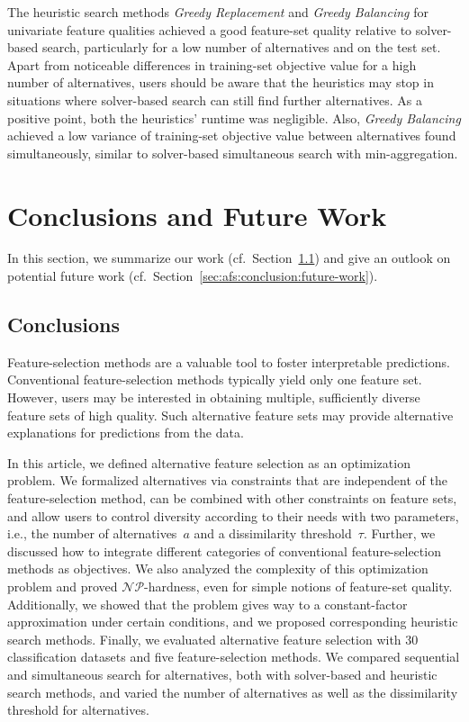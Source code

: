 \documentclass{article}
\theoremstyle{definition}
\begin{document}
The heuristic search methods \emph{Greedy Replacement} and \emph{Greedy Balancing} for univariate feature qualities achieved a good feature-set quality relative to solver-based search, particularly for a low number of alternatives and on the test set.
Apart from noticeable differences in training-set objective value for a high number of alternatives, users should be aware that the heuristics may stop in situations where solver-based search can still find further alternatives.
As a positive point, both the heuristics' runtime was negligible.
Also, \emph{Greedy Balancing} achieved a low variance of training-set objective value between alternatives found simultaneously, similar to solver-based simultaneous search with min-aggregation.

\section{Conclusions and Future Work}
\label{sec:afs:conclusion}

In this section, we summarize our work (cf.~Section~\ref{sec:afs:conclusion:conclusion}) and give an outlook on potential future work (cf.~Section~\ref{sec:afs:conclusion:future-work}).

\subsection{Conclusions}
\label{sec:afs:conclusion:conclusion}

Feature-selection methods are a valuable tool to foster interpretable predictions.
Conventional feature-selection methods typically yield only one feature set.
However, users may be interested in obtaining multiple, sufficiently diverse feature sets of high quality.
Such alternative feature sets may provide alternative explanations for predictions from the data.

In this article, we defined alternative feature selection as an optimization problem.
We formalized alternatives via constraints that are independent of the feature-selection method, can be combined with other constraints on feature sets, and allow users to control diversity according to their needs with two parameters, i.e., the number of alternatives~$a$ and a dissimilarity threshold~$\tau$.
Further, we discussed how to integrate different categories of conventional feature-selection methods as objectives.
We also analyzed the complexity of this optimization problem and proved $\mathcal{NP}$-hardness, even for simple notions of feature-set quality.
Additionally, we showed that the problem gives way to a constant-factor approximation under certain conditions, and we proposed corresponding heuristic search methods.
Finally, we evaluated alternative feature selection with 30 classification datasets and five feature-selection methods.
We compared sequential and simultaneous search for alternatives, both with solver-based and heuristic search methods, and varied the number of alternatives as well as the dissimilarity threshold for alternatives.
\end{document}
